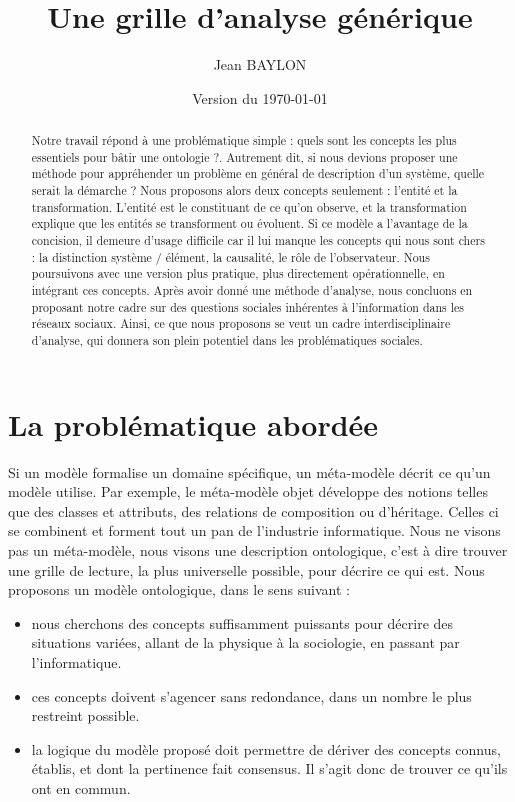 \documentclass[11pt]{article}
\author{Jean BAYLON}
\title{Une grille d'analyse générique}
\date{Version du \today{}}
\begin{document}
	\maketitle
	
	\begin{abstract}
		Notre travail répond à une problématique simple : \og{}quels sont les concepts les plus essentiels pour bâtir une ontologie ?\fg{}. Autrement dit, si nous devions proposer une méthode pour appréhender un problème en général de description d'un système, quelle serait la démarche ? Nous proposons alors deux concepts seulement : l'entité et la transformation. L'entité est le constituant de ce qu'on observe, et la transformation explique que les entités se transforment ou évoluent. Si ce modèle a l'avantage de la concision, il demeure d'usage difficile car il lui manque les concepts qui nous sont chers : la distinction système / élément, la causalité, le rôle de l'observateur. Nous poursuivons avec une version plus pratique, plus directement opérationnelle, en intégrant ces concepts. Après avoir donné une méthode d'analyse, nous concluons en proposant notre cadre sur des questions sociales inhérentes à l'information dans les réseaux sociaux. Ainsi, ce que nous proposons se veut un cadre interdisciplinaire d'analyse, qui donnera son plein potentiel dans les problématiques sociales. 
	\end{abstract}
	
	\section{La problématique abordée}
	
	Si un modèle formalise un domaine spécifique, un méta-modèle décrit ce qu'un modèle utilise. Par exemple, le méta-modèle objet développe des notions telles que des classes et attributs, des relations de composition ou d'héritage. Celles ci se combinent et forment tout un pan de l'industrie informatique. Nous ne visons pas un méta-modèle, nous visons une description ontologique, c'est à dire trouver une grille de lecture, la plus universelle possible, pour décrire ce qui est. Nous proposons un modèle ontologique, dans le sens suivant : 
	\begin{itemize}
		\item nous cherchons des concepts suffisamment puissants pour décrire des situations variées, allant de la physique à la sociologie, en passant par l'informatique. 
		\item ces concepts doivent s'agencer sans redondance, dans un nombre le plus restreint possible. 
		\item la logique du modèle proposé doit permettre de dériver des concepts connus, établis, et dont la pertinence fait consensus. Il s'agit donc de trouver ce qu'ils ont en commun. 
	\end{itemize}
	
\end{document}
